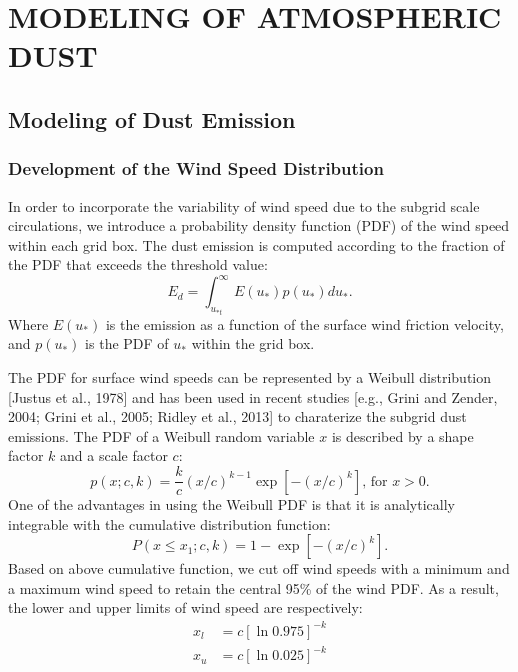 \chapter{MODELING OF ATMOSPHERIC DUST}

\section{Modeling of Dust Emission}

\subsection{Development of the Wind Speed Distribution}

  In order to incorporate the variability of wind speed due to the subgrid scale
  circulations, we introduce a probability density function (PDF) of the wind speed
  within each grid box. The dust emission is computed according to the fraction of 
  the PDF that exceeds the threshold value:
  \begin{equation}
  E_{d} = \int^\infty_{u_{*t}} E(u_*) p(u_*) d u_* \mbox{.}
  \end{equation}
  Where $E(u_*)$ is the emission as a function of the surface wind friction velocity,
  and $p(u_*)$ is the PDF of $u_*$ within the grid box. 

  The PDF for surface wind speeds can be represented by a Weibull distribution 
  [Justus et al., 1978] and has been used in recent studies [e.g., Grini and Zender,
  2004; Grini et al., 2005; Ridley et al., 2013] to charaterize the subgrid dust 
  emissions. The PDF of a Weibull random variable $x$ is described by a shape factor $k$ 
  and a scale factor $c$:
  \begin{equation}
  p(x;c,k) = \frac{k}{c} (x/c )^{k-1}
         \exp{\left[ -(x/c)^k \right]} \mbox{,  for } x>0 \mbox{.} 
  \end{equation}
  One of the advantages in using the Weibull PDF is that it is analytically 
  integrable with the cumulative distribution function:
  \begin{equation}
  P(x \leq x_1;c,k) = 1 - \exp{ \left[ -(x/c)^k\right] } \mbox{.}
  \end{equation} 
  Based on above cumulative function, we cut off wind speeds with a minimum and a 
  maximum wind speed to retain the central 95\% of the wind PDF. As a result, the 
  lower and upper limits of wind speed are respectively:
  \begin{align} 
  x_{l} &= c \left[ \ln{0.975} \right]^{-k}  \\
  x_{u} &= c \left[ \ln{0.025} \right]^{-k} \label{eq:xu}
  \end{align}

